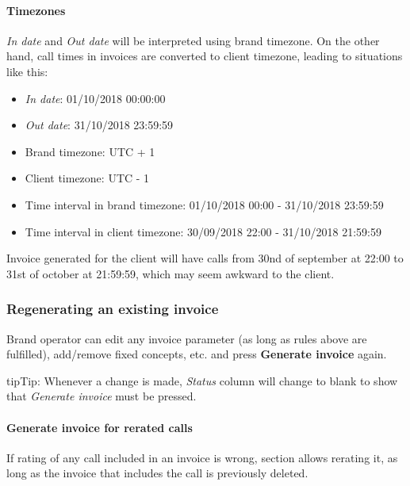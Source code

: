 \documentclass[letterpaper,10pt,english]{sphinxmanual}
\begin{document}
\paragraph{Timezones}
\label{administration_portal/brand/invoicing/invoices:timezones}
\emph{In date} and \emph{Out date} will be interpreted using brand timezone. On the other hand, call times in invoices are converted
to client timezone, leading to situations like this:
\begin{itemize}
\item {} 
\emph{In date}: 01/10/2018 00:00:00

\item {} 
\emph{Out date}: 31/10/2018 23:59:59

\item {} 
Brand timezone: UTC + 1

\item {} 
Client timezone: UTC - 1

\item {} 
Time interval in brand timezone: 01/10/2018 00:00 - 31/10/2018 23:59:59

\item {} 
Time interval in client timezone: 30/09/2018 22:00 - 31/10/2018 21:59:59

\end{itemize}

Invoice generated for the client will have calls from 30nd of september at 22:00 to 31st of october at 21:59:59, which
may seem awkward to the client.


\subsubsection{Regenerating an existing invoice}
\label{administration_portal/brand/invoicing/invoices:regenerating-an-existing-invoice}
Brand operator can edit any invoice parameter (as long as rules above are fulfilled), add/remove fixed concepts, etc. and
press \textbf{Generate invoice} again.

\begin{notice}{tip}{Tip:}
Whenever a change is made, \emph{Status} column will change to blank to show that \emph{Generate invoice} must be pressed.
\end{notice}


\paragraph{Generate invoice for rerated calls}
\label{administration_portal/brand/invoicing/invoices:generate-invoice-for-rerated-calls}
If rating of any call included in an invoice is wrong, {\hyperref[administration_portal/platform/external_calls:external\string-calls]{}} section allows rerating it, as long as the
invoice that includes the call is previously deleted.
\end{document}
